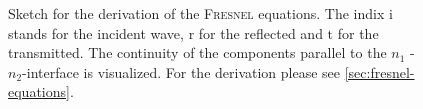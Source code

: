 \documentclass[../../thesis.tex]{subfiles}
\begin{document}
\begin{figure}[ht]
    \caption{Sketch for the derivation of the \textsc{Fresnel} equations. The indix $\mathrm{i}$ stands for the incident wave, $\mathrm{r}$ for the reflected and $\mathrm{t}$ for the transmitted. The continuity of the components parallel to the $n_1$ - $n_2$-interface is visualized. For the derivation please see \ref{sec:fresnel-equations}.}
    \label{fig:fresnel-equations}
\end{figure}
\end{document}
